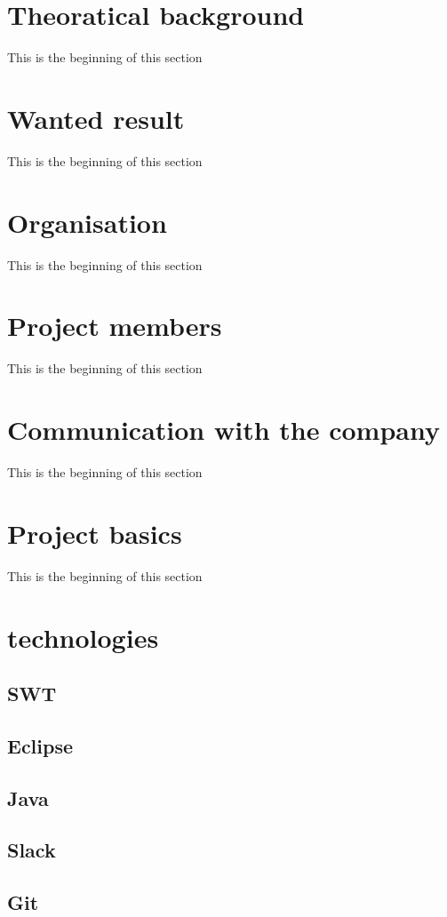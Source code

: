\documentclass[a4paper, 11pt]{scrartcl}
\begin{document}
    \section{Theoratical background}
        This is the beginning of this section

    \section{Wanted result}
        This is the beginning of this section
    \section{Organisation}
        This is the beginning of this section

    \section{Project members}
        This is the beginning of this section

    \section{Communication with the company}
        This is the beginning of this section

    \section{Project basics}
        This is the beginning of this section

    \section{technologies}

        \subsection{SWT}

        \subsection{Eclipse}

        \subsection{Java}

        \subsection{Slack}

        \subsection{Git}
\end{document}
